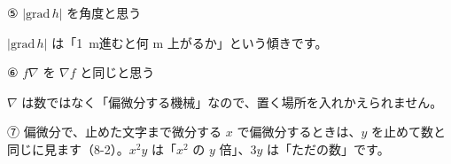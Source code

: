 \begingroup{}%
\noindent\begin{minipage}[t]{0.485\linewidth}\vspace{0pt}
\begin{tsumazuki}{⑤ $|\mathrm{grad}\,h|$ を角度と思う}
\raggedright{}
$|\mathrm{grad}\,h|$ は「\qty{1}{m}進むと何 m 上がるか」という傾きです。
\end{tsumazuki}
\end{minipage}\hfill
\begin{minipage}[t]{0.485\linewidth}\vspace{0pt}
\begin{tsumazuki}{⑥ $f\nabla$ を $\nabla f$ と同じと思う}
\raggedright{}
$\nabla$ は数ではなく「偏微分する機械」なので、置く場所を入れかえられません。
\end{tsumazuki}
\end{minipage}\par
\endgroup

\begin{tsumazuki}{⑦ 偏微分で、止めた文字まで微分する}
$x$ で偏微分するときは、$y$ を止めて数と同じに見ます（8-2）。$x^2y$ は「$x^2$ の $y$ 倍」、$3y$ は「ただの数」です。
\end{tsumazuki}

